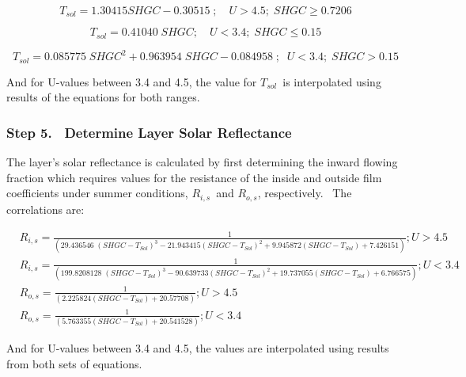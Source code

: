 \begin{equation}
{T_{sol}} = 1.30415SHGC - 0.30515\;;\quad U > 4.5;\;SHGC \ge 0.7206
\end{equation}

\begin{equation}
{T_{sol}} = 0.41040\;SHGC;\quad U < 3.4;\;SHGC \le 0.15
\end{equation}

\begin{equation}
{T_{sol}} = 0.085775\;SHG{C^2} + 0.963954\;SHGC - 0.084958\;;\;\;U < 3.4;\;SHGC > 0.15
\end{equation}

And for U-values between 3.4 and 4.5, the value for \({T_{sol}}\)~is interpolated using results of the equations for both ranges.

\subsubsection{Step 5.~ Determine Layer Solar Reflectance}\label{step-5.-determine-layer-solar-reflectance}

The layer's solar reflectance is calculated by first determining the inward flowing fraction which requires values for the resistance of the inside and outside film coefficients under summer conditions, \({R_{i,s}}\)~and \({R_{o,s}}\), respectively.~ The correlations are:

{\scriptsize
\begin{equation}
\begin{split}
&{R_{i,s}} = \frac{1}{{\left( {29.436546\;{{\left( {SHGC - {T_{Sol}}} \right)}^3} - 21.943415{{\left( {SHGC - {T_{Sol}}} \right)}^2} + 9.945872\left( {SHGC - {T_{Sol}}} \right) + 7.426151} \right)}}; U > 4.5 \\
&{R_{i,s}} = \frac{1}{{\left( {199.8208128\;{{\left( {SHGC - {T_{Sol}}} \right)}^3} - 90.639733{{\left( {SHGC - {T_{Sol}}} \right)}^2} + 19.737055\left( {SHGC - {T_{Sol}}} \right) + 6.766575} \right)}}; U < 3.4 \\
&{R_{o,s}} = \frac{1}{{\left( {2.225824(SHGC - {T_{Sol}}) + 20.57708} \right)}}; U > 4.5 \\
&{R_{o,s}} = \frac{1}{{\left( {5.763355(SHGC - {T_{Sol}}) + 20.541528} \right)}}; U < 3.4
\end{split}
\end{equation}}

And for U-values between 3.4 and 4.5, the values are interpolated using results from both sets of equations.


